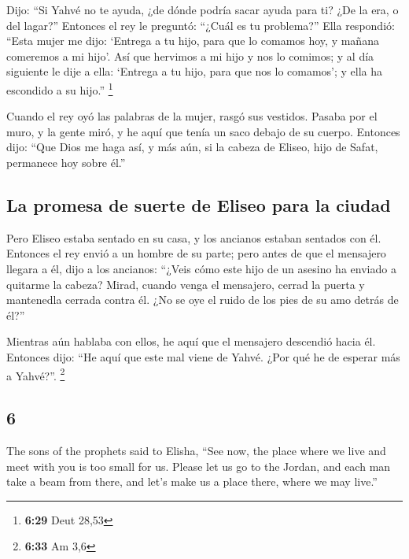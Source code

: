 \begin{paracol}{2}
 Dijo: ``Si Yahvé no te ayuda, ¿de dónde podría sacar
ayuda para ti? ¿De la era, o del lagar?''  Entonces el
rey le preguntó: ``¿Cuál es tu problema?'' Ella respondió: ``Esta mujer
me dijo: `Entrega a tu hijo, para que lo comamos hoy, y mañana comeremos
a mi hijo'.  Así que hervimos a mi hijo y nos lo comimos;
y al día siguiente le dije a ella: `Entrega a tu hijo, para que nos lo
comamos'; y ella ha escondido a su hijo.'' \footnote{\textbf{6:29} Deut
  28,53}

 Cuando el rey oyó las palabras de la mujer, rasgó sus
vestidos. Pasaba por el muro, y la gente miró, y he aquí que tenía un
saco debajo de su cuerpo.  Entonces dijo: ``Que Dios me
haga así, y más aún, si la cabeza de Eliseo, hijo de Safat, permanece
hoy sobre él.''

\hypertarget{la-promesa-de-suerte-de-eliseo-para-la-ciudad}{%
\subsection{La promesa de suerte de Eliseo para la
ciudad}\label{la-promesa-de-suerte-de-eliseo-para-la-ciudad}}

 Pero Eliseo estaba sentado en su casa, y los ancianos
estaban sentados con él. Entonces el rey envió a un hombre de su parte;
pero antes de que el mensajero llegara a él, dijo a los ancianos:
``¿Veis cómo este hijo de un asesino ha enviado a quitarme la cabeza?
Mirad, cuando venga el mensajero, cerrad la puerta y mantenedla cerrada
contra él. ¿No se oye el ruido de los pies de su amo detrás de él?''

 Mientras aún hablaba con ellos, he aquí que el mensajero
descendió hacia él. Entonces dijo: ``He aquí que este mal viene de
Yahvé. ¿Por qué he de esperar más a Yahvé?''. \footnote{\textbf{6:33} Am
  3,6}

\switchcolumn
\begin{otherlanguage}{english}

\hypertarget{section-11}{%
\section{6}\label{section-11}}

 The sons of the prophets said to Elisha, ``See now, the
place where we live and meet with you is too small for us.
 Please let us go to the Jordan, and each man take a beam
from there, and let's make us a place there, where we may live.''


\end{otherlanguage}
\end{paracol}
